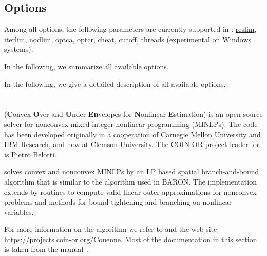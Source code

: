 
\subsection{Options}

Among all \CBC options, the following \GAMS parameters are currently supported in \CBC:
\hyperlink{reslim}{reslim}, \hyperlink{iterlim}{iterlim}, \hyperlink{nodlim}{nodlim}, \hyperlink{optca}{optca}, \hyperlink{optcr}{optcr}, \hyperlink{increment}{cheat}, \hyperlink{cutoff}{cutoff}, \hyperlink{threads}{threads} (experimental on Windows systems).

In the following, we summarize all available \CBC options.

In the following, we give a detailed description of all available \CBC options.

\section{\COUENNE}


\COUENNE (\textbf{C}onvex \textbf{O}ver and \textbf{U}nder \textbf{En}velopes for \textbf{N}onlinear \textbf{E}stimation) is an open-source solver for nonconvex mixed-integer nonlinear programming (MINLPs).
The code has been developed originally in a cooperation of Carnegie Mellon University and IBM Research, and now at Clemson University.
The COIN-OR project leader for \COUENNE is Pietro Belotti.

\COUENNE solves convex and nonconvex MINLPs by an LP based spatial branch-and-bound algorithm that is similar to the algorithm used in \textsc{BARON}.
The implementation extends \BONMIN by routines to compute valid linear outer approximations for nonconvex problems and methods for bound tightening and branching on nonlinear variables.

For more information on the algorithm we refer to \cite{Be09,BeLeLiMaWa08} and the \COUENNE web site \url{https://projects.coin-or.org/Couenne}.
Most of the \COUENNE documentation in this section is taken from the \COUENNE manual~\cite{CouenneManual}.

